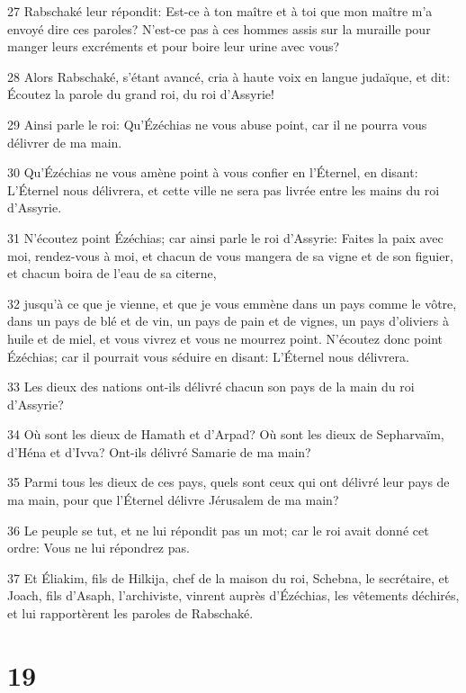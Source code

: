 \par 27 Rabschaké leur répondit: Est-ce à ton maître et à toi que mon maître m'a envoyé dire ces paroles? N'est-ce pas à ces hommes assis sur la muraille pour manger leurs excréments et pour boire leur urine avec vous?
\par 28 Alors Rabschaké, s'étant avancé, cria à haute voix en langue judaïque, et dit: Écoutez la parole du grand roi, du roi d'Assyrie!
\par 29 Ainsi parle le roi: Qu'Ézéchias ne vous abuse point, car il ne pourra vous délivrer de ma main.
\par 30 Qu'Ézéchias ne vous amène point à vous confier en l'Éternel, en disant: L'Éternel nous délivrera, et cette ville ne sera pas livrée entre les mains du roi d'Assyrie.
\par 31 N'écoutez point Ézéchias; car ainsi parle le roi d'Assyrie: Faites la paix avec moi, rendez-vous à moi, et chacun de vous mangera de sa vigne et de son figuier, et chacun boira de l'eau de sa citerne,
\par 32 jusqu'à ce que je vienne, et que je vous emmène dans un pays comme le vôtre, dans un pays de blé et de vin, un pays de pain et de vignes, un pays d'oliviers à huile et de miel, et vous vivrez et vous ne mourrez point. N'écoutez donc point Ézéchias; car il pourrait vous séduire en disant: L'Éternel nous délivrera.
\par 33 Les dieux des nations ont-ils délivré chacun son pays de la main du roi d'Assyrie?
\par 34 Où sont les dieux de Hamath et d'Arpad? Où sont les dieux de Sepharvaïm, d'Héna et d'Ivva? Ont-ils délivré Samarie de ma main?
\par 35 Parmi tous les dieux de ces pays, quels sont ceux qui ont délivré leur pays de ma main, pour que l'Éternel délivre Jérusalem de ma main?
\par 36 Le peuple se tut, et ne lui répondit pas un mot; car le roi avait donné cet ordre: Vous ne lui répondrez pas.
\par 37 Et Éliakim, fils de Hilkija, chef de la maison du roi, Schebna, le secrétaire, et Joach, fils d'Asaph, l'archiviste, vinrent auprès d'Ézéchias, les vêtements déchirés, et lui rapportèrent les paroles de Rabschaké.

\chapter{19}

